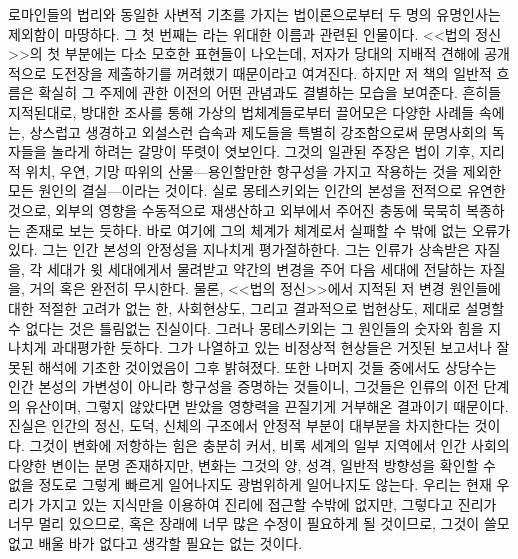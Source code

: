 로마인들의 법리와 동일한 사변적 기초를 가지는 법이론으로부터
두 명의 유명인사는 제외함이 마땅하다.
그 첫 번째는 라는 위대한 이름과 관련된 인물이다.
<<법의 정신>>의 첫 부분에는 다소 모호한 표현들이 나오는데,
저자가 당대의 지배적 견해에 공개적으로 도전장을 제출하기를 꺼려했기
때문이라고 여겨진다.
하지만 저 책의 일반적 흐름은 확실히 그 주제에 관한 이전의 어떤 관념과도
결별하는 모습을 보여준다.
흔히들 지적된대로,
방대한 조사를 통해 가상의 법체계들로부터 끌어모은 다양한 사례들 속에는,
상스럽고 생경하고 외설스런 습속과 제도들을 특별히 강조함으로써
문명사회의 독자들을 놀라게 하려는 갈망이 뚜렷이 엿보인다.
그것의 일관된 주장은 법이 기후, 지리적 위치, 우연, 기망 따위의
산물---용인할만한 항구성을 가지고 작용하는 것을 제외한 모든 원인의
결실---이라는 것이다.
실로 몽테스키외는 인간의 본성을 전적으로 유연한 것으로,
외부의 영향을 수동적으로 재생산하고 외부에서 주어진 충동에 묵묵히 복종하는
존재로 보는 듯하다.
바로 여기에 그의 체계가 체계로서 실패할 수 밖에 없는 오류가 있다.
그는 인간 본성의 안정성을 지나치게 평가절하한다.
그는 인류가 상속받은 자질을,
각 세대가 윗 세대에게서 물려받고 약간의 변경을 주어 다음 세대에
전달하는 자질을,
거의 혹은 완전히 무시한다.
물론, <<법의 정신>>에서 지적된 저 변경 원인들에 대한 적절한 고려가
없는 한, 사회현상도, 그리고 결과적으로 법현상도, 제대로 설명할 수 없다는
것은 틀림없는 진실이다.
그러나 몽테스키외는 그 원인들의 숫자와 힘을 지나치게 과대평가한 듯하다.
그가 나열하고 있는 비정상적 현상들은 거짓된 보고서나
잘못된 해석에 기초한 것이었음이 그후 밝혀졌다.
또한 나머지 것들 중에서도 상당수는 인간 본성의 가변성이 아니라
항구성을 증명하는 것들이니,
그것들은 인류의 이전 단계의 유산이며,
그렇지 않았다면 받았을 영향력을 끈질기게 거부해온
결과이기 때문이다.
진실은 인간의 정신, 도덕, 신체의 구조에서 안정적 부분이 대부분을
차지한다는 것이다.
그것이 변화에 저항하는 힘은 충분히 커서,
비록 세계의 일부 지역에서 인간 사회의 다양한 변이는 분명 존재하지만,
변화는 그것의 양, 성격, 일반적 방향성을 확인할 수 없을 정도로
그렇게 빠르게 일어나지도 광범위하게 일어나지도 않는다.
우리는
현재 우리가 가지고 있는 지식만을 이용하여 진리에 접근할 수밖에 없지만,
그렇다고
진리가 너무 멀리 있으므로, 혹은 
장래에 너무 많은 수정이 필요하게 될 것이므로,
그것이 쓸모없고 배울 바가 없다고 생각할 필요는 없는 것이다.

